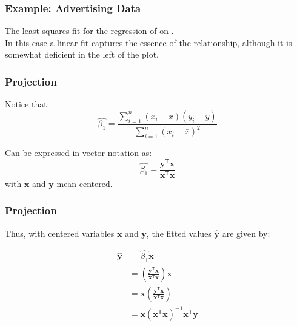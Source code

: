\documentclass[12pt]{beamer}\usepackage[]{graphicx}\usepackage[]{color}
\begin{document}

\begin{frame}
\frametitle{Example: Advertising Data}
\begin{center}
\end{center}

{\footnotesize The least squares fit for the regression of  on . \\
In this case a linear fit captures the essence of the relationship, although 
it is somewhat deficient in the left of the plot.}

\end{frame}


\begin{frame}
\begin{center}
\Huge{}
\end{center}
\end{frame}


\begin{frame}
\frametitle{Projection}

Notice that:
$$
\hat{\beta_1} = \frac{\sum_{i=1}^{n} (x_i - \bar{x})(y_i - \bar{y})}{\sum_{i=1}^{n} (x_i - \bar{x})^2}
$$

\bigskip
Can be expressed in vector notation as:
{\large
$$
\hat{\beta_1} = \frac{\mathbf{y^\mathsf{T} x}}{\mathbf{x^\mathsf{T} x}}
$$
}
with $\mathbf{x}$ and $\mathbf{y}$ mean-centered.

\end{frame}


\begin{frame}
\frametitle{Projection}

Thus, with centered variables $\mathbf{x}$ and $\mathbf{y}$, the fitted values 
$\mathbf{\hat{y}}$ are given by:

{\large
\begin{align*}
\mathbf{\hat{y}} &= \hat{\beta_1} \mathbf{x} \\
&= \left( \frac{\mathbf{y^\mathsf{T} x}}{\mathbf{x^\mathsf{T} x}} \right) \mathbf{x} \\
&= \mathbf{x} \left( \frac{\mathbf{y^\mathsf{T} x}}{\mathbf{x^\mathsf{T} x}} \right) \\
&= \mathbf{x} (\mathbf{x^\mathsf{T} x})^{-1} \mathbf{x^\mathsf{T} y} 
\end{align*}
}

\end{frame}
\end{document}

